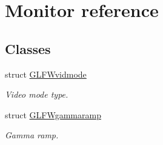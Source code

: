 \hypertarget{group__monitor}{}\section{Monitor reference}
\label{group__monitor}
\subsection*{Classes}
\begin{DoxyCompactItemize}
\item 
struct \hyperlink{structGLFWvidmode}{G\+L\+F\+Wvidmode}
\begin{DoxyCompactList}\small\item\em Video mode type. \end{DoxyCompactList}\item 
struct \hyperlink{structGLFWgammaramp}{G\+L\+F\+Wgammaramp}
\begin{DoxyCompactList}\small\item\em Gamma ramp. \end{DoxyCompactList}\end{DoxyCompactItemize}
